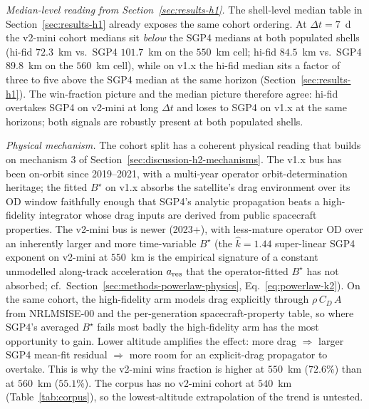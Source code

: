 \documentclass[10pt, letterpaper]{article}
\begin{document}
\emph{Median-level reading from Section~\ref{sec:results-h1}.}
The shell-level median table in
Section~\ref{sec:results-h1} already exposes the same cohort
ordering. At $\Delta t = 7$~d the v2-mini cohort medians sit
\emph{below} the SGP4 medians at both populated shells
(hi-fid $72.3$~km vs.\ SGP4 $101.7$~km on the $550$~km cell;
hi-fid $84.5$~km vs.\ SGP4 $89.8$~km on the $560$~km cell), while
on v1.x the hi-fid median sits a factor of three to five above
the SGP4 median at the same horizon
(Section~\ref{sec:results-h1}). The win-fraction picture and the
median picture therefore agree: hi-fid overtakes SGP4 on
v2-mini at long $\Delta t$ and loses to SGP4 on v1.x at the
same horizons; both signals are robustly present at both
populated shells.

\emph{Physical mechanism.} The cohort split has a coherent
physical reading that builds on mechanism 3 of
Section~\ref{sec:discussion-h2-mechanisms}. The v1.x bus has
been on-orbit since 2019--2021, with a multi-year operator
orbit-determination heritage; the fitted $B^{\!\star}$ on
v1.x absorbs the satellite's drag environment over its OD
window faithfully enough that SGP4's analytic propagation
beats a high-fidelity integrator whose drag inputs are derived
from public spacecraft properties. The v2-mini bus is newer
(2023+), with less-mature operator OD over an inherently
larger and more time-variable
$B^{\!\star}$ (the
$\hat k = 1.44$ super-linear SGP4 exponent on v2-mini at
$550$~km is the empirical signature of a constant unmodelled
along-track acceleration $a_{\rm{res}}$ that the operator-fitted
$B^{\!\star}$ has not absorbed; cf.\
Section~\ref{sec:methods-powerlaw-physics},
Eq.~\eqref{eq:powerlaw-k2}). On the same cohort, the
high-fidelity arm models drag explicitly through
$\rho\,C_{D}\,A$ from NRLMSISE-00 and the per-generation
spacecraft-property table, so where SGP4's averaged
$B^{\!\star}$ fails most badly the high-fidelity arm has the
most opportunity to gain. Lower altitude amplifies the effect:
more drag $\Rightarrow$ larger SGP4 mean-fit residual
$\Rightarrow$ more room for an explicit-drag propagator to
overtake. This is why the v2-mini wins fraction is higher at
$550$~km ($72.6\%$) than at $560$~km ($55.1\%$). The corpus
has no v2-mini cohort at $540$~km
(Table~\ref{tab:corpus}), so the lowest-altitude extrapolation
of the trend is untested.
\end{document}
